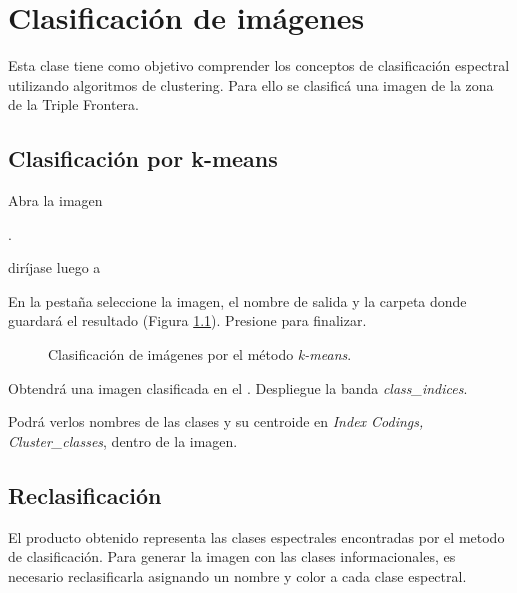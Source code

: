 \chapter{Clasificación de imágenes}

Esta clase tiene como objetivo comprender los conceptos de clasificación espectral utilizando algoritmos de clustering. Para ello se clasificá una imagen de la zona de la Triple Frontera.

\section{Clasificación por k-means}

Abra la imagen

\begin{center}
.
\end{center}

diríjase luego a
\begin{center}
\end{center}

En la pestaña  seleccione la imagen, el nombre de salida y la carpeta donde guardará el resultado (Figura \ref{fig:kmeans}). Presione  para finalizar.

\begin{figure}[h!]
    \centering
    \hspace{1cm}
    \caption{Clasificación de imágenes por el método \emph{k-means}.}
    \label{fig:kmeans}
\end{figure}

Obtendrá una imagen clasificada en el . Despliegue la banda \emph{class\_indices}.

Podrá verlos nombres de las clases y su centroide en \emph{Index Codings, Cluster\_classes}, dentro de la imagen.

\section{Reclasificación}


El producto obtenido representa las clases espectrales encontradas por el metodo de clasificación. Para generar la imagen con las clases informacionales, es necesario reclasificarla asignando un nombre y color a cada clase espectral.

